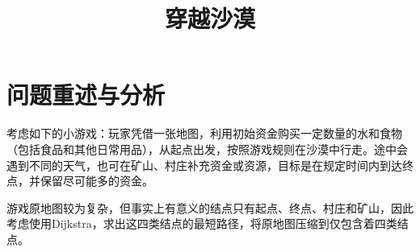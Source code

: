 \documentclass[withoutpre]{cumcmthesis} %
\title{穿越沙漠}
\begin{document}
 \maketitle
 \begin{abstract}


\end{abstract}


\section{问题重述与分析}
考虑如下的小游戏：玩家凭借一张地图，利用初始资金购买一定数量的水和食物（包括食品和其他日常用品），从起点出发，按照游戏规则在沙漠中行走。途中会遇到不同的天气，也可在矿山、村庄补充资金或资源，目标是在规定时间内到达终点，并保留尽可能多的资金。

游戏原地图较为复杂，但事实上有意义的结点只有起点、终点、村庄和矿山，因此考虑使用Dijkstra\cite{dijkstra}，求出这四类结点的最短路径，将原地图压缩到仅包含着四类结点。
\end{document}
